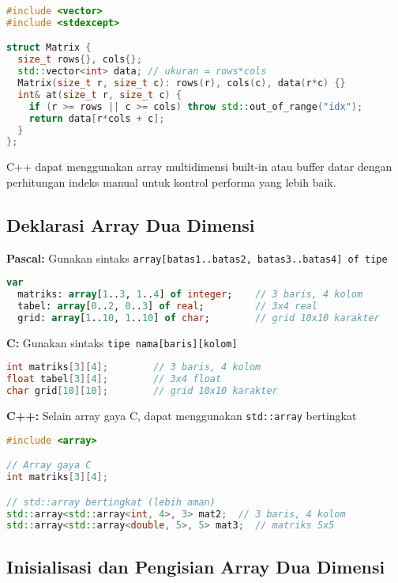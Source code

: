 \documentclass[../main.tex]{subfiles}
\begin{document}
\begin{lstlisting}[language=C++, caption={Representasi datar dengan std::vector (C++)}]
#include <vector>
#include <stdexcept>

struct Matrix {
  size_t rows{}, cols{};
  std::vector<int> data; // ukuran = rows*cols
  Matrix(size_t r, size_t c): rows(r), cols(c), data(r*c) {}
  int& at(size_t r, size_t c) {
    if (r >= rows || c >= cols) throw std::out_of_range("idx");
    return data[r*cols + c];
  }
};
\end{lstlisting}

C++ dapat menggunakan array multidimensi built-in atau buffer datar dengan perhitungan indeks manual untuk kontrol performa yang lebih baik.

\subsection{Deklarasi Array Dua Dimensi}

\textbf{Pascal:} Gunakan sintaks \texttt{array[batas1..batas2, batas3..batas4] of tipe}
\begin{lstlisting}[language=Pascal, caption={Deklarasi array 2D di Pascal}]
var
  matriks: array[1..3, 1..4] of integer;    // 3 baris, 4 kolom
  tabel: array[0..2, 0..3] of real;         // 3x4 real
  grid: array[1..10, 1..10] of char;        // grid 10x10 karakter
\end{lstlisting}

\textbf{C:} Gunakan sintaks \texttt{tipe nama[baris][kolom]}
\begin{lstlisting}[language=C, caption={Deklarasi array 2D di C}]
int matriks[3][4];        // 3 baris, 4 kolom
float tabel[3][4];        // 3x4 float
char grid[10][10];        // grid 10x10 karakter
\end{lstlisting}

\textbf{C++:} Selain array gaya C, dapat menggunakan \texttt{std::array} bertingkat
\begin{lstlisting}[language=C++, caption={Deklarasi array 2D di C++}]
#include <array>

// Array gaya C
int matriks[3][4];

// std::array bertingkat (lebih aman)
std::array<std::array<int, 4>, 3> mat2;  // 3 baris, 4 kolom
std::array<std::array<double, 5>, 5> mat3;  // matriks 5x5
\end{lstlisting}

\subsection{Inisialisasi dan Pengisian Array Dua Dimensi}
\end{document}
